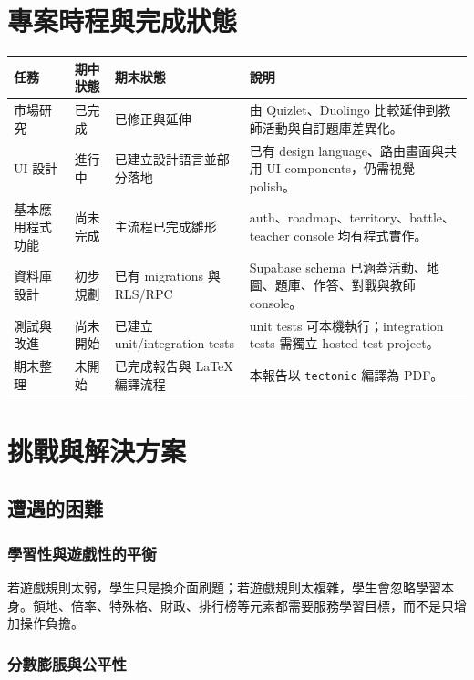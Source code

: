 \documentclass[12pt,a4paper]{article}
\begin{document}
\section{專案時程與完成狀態}

\begin{longtable}{P{3.6cm}P{2.7cm}P{3.0cm}P{5.4cm}}
\toprule
任務 & 期中狀態 & 期末狀態 & 說明 \\
\midrule
市場研究 & 已完成 & 已修正與延伸 & 由 Quizlet、Duolingo 比較延伸到教師活動與自訂題庫差異化。 \\
\midrule
UI 設計 & 進行中 & 已建立設計語言並部分落地 & 已有 design language、路由畫面與共用 UI components，仍需視覺 polish。 \\
\midrule
基本應用程式功能 & 尚未完成 & 主流程已完成雛形 & auth、roadmap、territory、battle、teacher console 均有程式實作。 \\
\midrule
資料庫設計 & 初步規劃 & 已有 migrations 與 RLS/RPC & Supabase schema 已涵蓋活動、地圖、題庫、作答、對戰與教師 console。 \\
\midrule
測試與改進 & 尚未開始 & 已建立 unit/integration tests & unit tests 可本機執行；integration tests 需獨立 hosted test project。 \\
\midrule
期末整理 & 未開始 & 已完成報告與 LaTeX 編譯流程 & 本報告以 \texttt{tectonic} 編譯為 PDF。 \\
\bottomrule
\end{longtable}

\section{挑戰與解決方案}

\subsection{遭遇的困難}

\subsubsection{學習性與遊戲性的平衡}

若遊戲規則太弱，學生只是換介面刷題；若遊戲規則太複雜，學生會忽略學習本身。領地、倍率、特殊格、財政、排行榜等元素都需要服務學習目標，而不是只增加操作負擔。

\subsubsection{分數膨脹與公平性}
\end{document}
